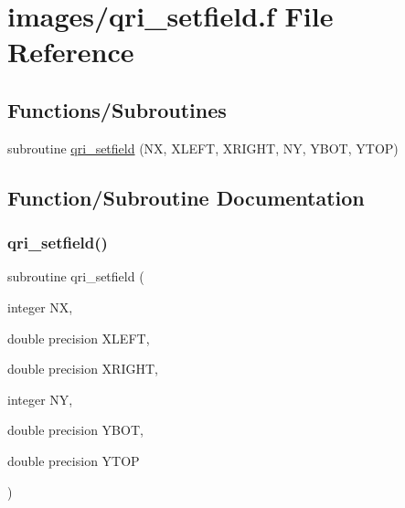 \hypertarget{qri__setfield_8f}{}\section{images/qri\+\_\+setfield.f File Reference}
\label{qri__setfield_8f}
\subsection*{Functions/\+Subroutines}
\begin{DoxyCompactItemize}
\item 
subroutine \hyperlink{qri__setfield_8f_a695a5a6d311d6047cd4c14a08ef473d3}{qri\+\_\+setfield} (NX, X\+L\+E\+FT, X\+R\+I\+G\+HT, NY, Y\+B\+OT, Y\+T\+OP)
\end{DoxyCompactItemize}


\subsection{Function/\+Subroutine Documentation}
\mbox{\label{qri__setfield_8f_a695a5a6d311d6047cd4c14a08ef473d3}} 
\subsubsection{\texorpdfstring{qri\+\_\+setfield()}{qri\_setfield()}}
{\footnotesize\ttfamily subroutine qri\+\_\+setfield (\begin{DoxyParamCaption}\item[{integer}]{NX,  }\item[{double precision}]{X\+L\+E\+FT,  }\item[{double precision}]{X\+R\+I\+G\+HT,  }\item[{integer}]{NY,  }\item[{double precision}]{Y\+B\+OT,  }\item[{double precision}]{Y\+T\+OP }\end{DoxyParamCaption})}

